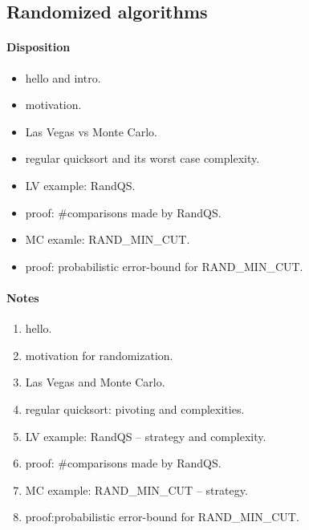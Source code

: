\newpage

\subsection{Randomized algorithms}


\paragraph{Disposition}

\begin{itemize}
  \item hello and intro.
  \item motivation.

  \item Las Vegas vs Monte Carlo.
  \item regular quicksort and its worst case complexity.

  \item LV example: RandQS.
  \item proof: \#comparisons made by RandQS.

  \item MC examle: RAND\_MIN\_CUT.
  \item proof: probabilistic error-bound for RAND\_MIN\_CUT.
\end{itemize}



\paragraph{Notes}

\begin{enumerate}
  \item hello.

  \item motivation for randomization.

  \item Las Vegas and Monte Carlo.

  \item regular quicksort: pivoting and complexities.

  \item LV example: RandQS -- strategy and complexity.

  \item proof: \#comparisons made by RandQS.

  \item MC example: RAND\_MIN\_CUT -- strategy.
  \item proof:probabilistic error-bound for RAND\_MIN\_CUT.
\end{enumerate}


